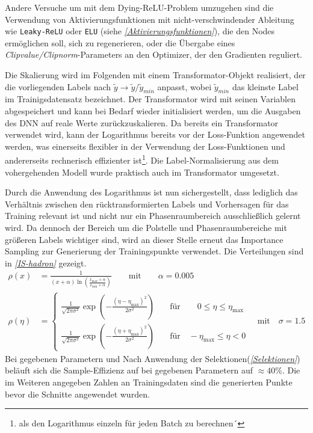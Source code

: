 Andere Versuche um mit dem Dying-ReLU-Problem umzugehen sind die Verwendung von Aktivierungsfunktionen mit nicht-verschwindender Ableitung wie \texttt{Leaky-ReLU} oder \texttt{ELU} (siehe \textit{\autoref{Aktivierungsfunktionen}}), die den Nodes ermöglichen soll, sich zu regenerieren, oder die Übergabe eines \textit{Clipvalue/Clipnorm}-Parameters an den Optimizer, der den Gradienten reguliert.

Die Skalierung wird im Folgenden mit einem Transformator-Objekt realisiert, der die vorliegenden Labels nach $\tilde{y} \rightarrow \tilde{y}/{\tilde{y}_{min}}$
anpasst, wobei $\tilde{y}_{min}$ das kleinste Label im Trainigsdatensatz bezeichnet. Der Transformator wird mit seinen Variablen abgespeichert und kann bei Bedarf wieder initialisiert werden, um die Ausgaben des DNN auf reale Werte zurückzuskalieren. 
Da bereits ein Transformator verwendet wird, kann der Logarithmus bereits vor der Loss-Funktion angewendet werden, was einerseits flexibler in der Verwendung der Loss-Funktionen und andererseits rechnerisch effizienter ist\footnote{als den Logarithmus einzeln für jeden Batch zu berechnen´}. Die Label-Normalisierung aus dem vohergehenden Modell wurde praktisch auch im Transformator umgesetzt.

Durch die Anwendung des Logarithmus ist nun sichergestellt, dass lediglich das Verhältnis zwischen den rücktransformierten Labels und Vorhersagen für das Training relevant ist und nicht nur ein Phasenraumbereich ausschließlich gelernt wird. Da dennoch der Bereich um die Polstelle und Phasenraumbereiche mit größeren Labels wichtiger sind, wird an dieser Stelle erneut das Importance Sampling zur Generierung der Trainingspunkte verwendet. Die Verteilungen sind in \textit{\autoref{IS-hadron}} gezeigt.  
\begin{equation}
\begin{aligned}
\rho(x) &= \frac{1}{(x + \alpha)\ln(\frac{x_{\text{max}} + \alpha}{x_{\text{min}}+ \alpha})} \qquad \text{mit} \qquad \alpha = 0.005 \\
\rho(\eta) &= \begin{cases}
\frac{1}{\sqrt{2\pi \sigma^2}} \exp(-\frac{(\eta - \eta_{\text{max}})^2}{2\sigma^2}) \quad & \text{für} \qquad 0 \leq \eta \leq \eta_{\text{max}}\\
\frac{1}{\sqrt{2\pi \sigma^2}} \exp(-\frac{(\eta + \eta_{\text{max}})^2}{2\sigma^2}) \quad & \text{für} \quad -\eta_{\text{max}} \leq \eta < 0
\end{cases} \quad \text{mit} \quad \sigma = 1.5
\end{aligned}
\label{IS-hadron}
\end{equation}
Bei gegebenen Parametern und Nach Anwendung der Selektionen(\textit{\autoref{Selektionen}}) beläuft sich die Sample-Effizienz auf bei gegebenen Parametern auf $\approx 40\%$. Die im Weiteren angegeben Zahlen an Trainingsdaten sind die generierten Punkte bevor die Schnitte angewendet wurden.

